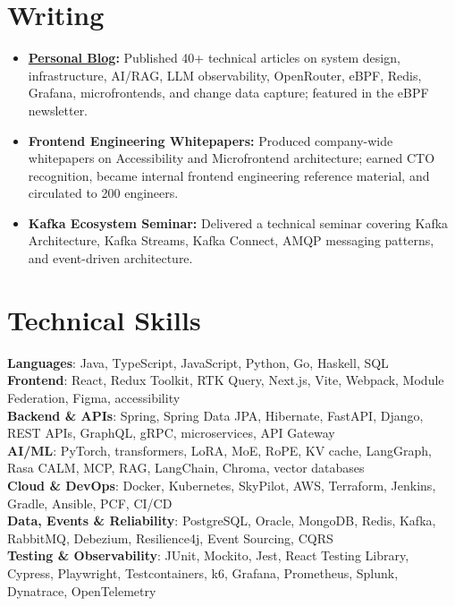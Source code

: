 \documentclass[letterpaper,11pt]{article}
\newcommand{\resumeItem}[1]{\item\small{{#1 \vspace{-3pt}}}}
\begin{document}
\section{Writing}
\vspace{-2pt}
\begin{itemize}[leftmargin=0.15in]\small
  \resumeItem{\textbf{\href{https://aymanace2049.hashnode.dev}{Personal Blog}:} Published 40+ technical articles on system design, infrastructure, AI/RAG, LLM observability, OpenRouter, eBPF, Redis, Grafana, microfrontends, and change data capture; featured in the eBPF newsletter.}
  \resumeItem{\textbf{Frontend Engineering Whitepapers:} Produced company-wide whitepapers on Accessibility and Microfrontend architecture; earned CTO recognition, became internal frontend engineering reference material, and circulated to 200 engineers.}
  \resumeItem{\textbf{Kafka Ecosystem Seminar:} Delivered a technical seminar covering Kafka Architecture, Kafka Streams, Kafka Connect, AMQP messaging patterns, and event-driven architecture.}
\end{itemize}

\section{Technical Skills}
\vspace{-2pt}
\begin{itemize}
[leftmargin=0.15in, label={}]\small{\item{
\textbf{Languages}{: Java, TypeScript, JavaScript, Python, Go, Haskell, SQL} \\
\textbf{Frontend}{: React, Redux Toolkit, RTK Query, Next.js, Vite, Webpack, Module Federation, Figma, accessibility} \\
\textbf{Backend \& APIs}{: Spring, Spring Data JPA, Hibernate, FastAPI, Django, REST APIs, GraphQL, gRPC, microservices, API Gateway} \\
\textbf{AI/ML}{: PyTorch, transformers, LoRA, MoE, RoPE, KV cache, LangGraph, Rasa CALM, MCP, RAG, LangChain, Chroma, vector databases} \\
\textbf{Cloud \& DevOps}{: Docker, Kubernetes, SkyPilot, AWS, Terraform, Jenkins, Gradle, Ansible, PCF, CI/CD} \\
\textbf{Data, Events \& Reliability}{: PostgreSQL, Oracle, MongoDB, Redis, Kafka, RabbitMQ, Debezium, Resilience4j, Event Sourcing, CQRS} \\
\textbf{Testing \& Observability}{: JUnit, Mockito, Jest, React Testing Library, Cypress, Playwright, Testcontainers, k6, Grafana, Prometheus, Splunk, Dynatrace, OpenTelemetry}
}}
\end{itemize}
\end{document}
